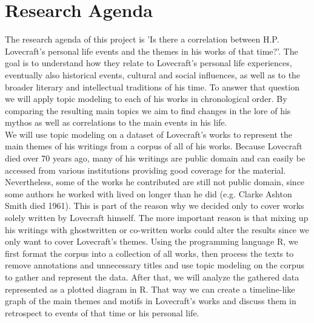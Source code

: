 \section{Research Agenda}

The research agenda of this project is 'Is there a correlation between H.P. Lovecraft's personal 
life events and the themes in his works of that time?'. The goal is to understand how they relate 
to Lovecraft's personal life experiences, eventually also historical events, cultural and social 
influences, as well as to the broader literary and intellectual traditions of his time. To answer 
that question we will apply topic modeling to each of his works in chronological order. By 
comparing the resulting main topics we aim to find changes in the lore of his mythos as well 
as correlations to the main events in his life.\\

We will use topic modeling on a dataset of Lovecraft's works to represent the main themes of his 
writings from a corpus of all of his works. Because Lovecraft died over 70 years ago, many of his 
writings are public domain and can easily be accessed from various institutions providing good 
coverage for the material. Nevertheless, some of the works he contributed are still not public 
domain, since some authors he worked with lived on longer than he did (e.g. Clarke Ashton Smith 
died 1961). This is part of the reason why we decided only to cover works solely written by 
Lovecraft himself. The more important reason is that mixing up his writings with ghostwritten or 
co-written works could alter the results since we only want to cover Lovecraft's themes. Using the 
programming language R, we first format the corpus into a collection of all works, then process 
the texts to remove annotations and unnecessary titles and use topic modeling on the corpus to 
gather and represent the data. After that, we will analyze the gathered data represented as a 
plotted diagram in R. That way we can create a timeline-like graph of the main themes and motifs 
in Lovecraft's works and discuss them in retrospect to events of that time or his personal life.\\

